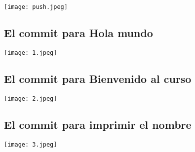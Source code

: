 \documentclass{article}
\begin{document}
             \texttt{[image: push.jpeg]}
            \subsection{El commit para Hola mundo}
 
             \texttt{[image: 1.jpeg]}
             \subsection{El commit para Bienvenido al curso}
 
             \texttt{[image: 2.jpeg]}
             \subsection{El commit para imprimir el nombre}
 
             \texttt{[image: 3.jpeg]}
\end{document}
